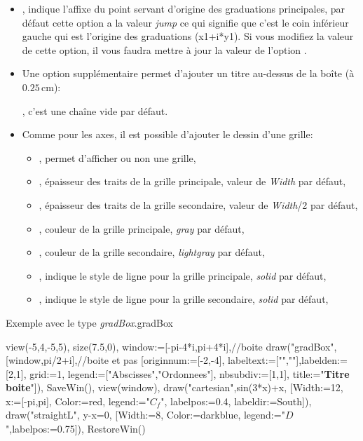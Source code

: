 \begin{itemize}
\begin{itemize}
  \item {}
  \item {}
  \end{itemize}
 \item {}, indique l'affixe du point servant d'origine des graduations principales, par défaut cette option a la valeur \emph{jump} ce qui signifie que c'est le coin inférieur gauche qui est l'origine des graduations (x1+i*y1). Si vous modifiez la valeur de cette option, il vous faudra mettre à jour la valeur de l'option .
 \item Une option supplémentaire permet d'ajouter un titre au-dessus de la boîte (à $0.25$\,cm):\par
{\centering {}, c'est une chaîne vide par défaut.\par}
 \item Comme pour les axes, il est possible d'ajouter le dessin d'une grille:
  \begin{itemize}
  \item {}, permet d'afficher ou non une grille,
  \item {}, épaisseur des traits de la grille principale, valeur de \emph{Width} par défaut,
  \item {}, épaisseur des traits de la grille secondaire, valeur de \emph{Width}/2 par défaut,
  \item {}, couleur de la grille principale, \emph{gray} par défaut,
  \item {}, couleur de la grille secondaire, \emph{lightgray} par défaut,
  \item {}, indique le style de ligne pour la grille principale, \emph{solid} par défaut,
  \item {}, indique le style de ligne pour la grille secondaire, \emph{solid} par défaut,
  \end{itemize}
\end{itemize}

\begin{demo}{Exemple avec le type \emph{gradBox}.}{gradBox}
\begin{texgraph}[name=gradBox]
view(-5,4,-5,5), size(7.5,0),
window:=[-pi-4*i,pi+4*i],//boite
draw("gradBox",[window,pi/2+i],//boite et pas
 [originnum:=[-2,-4], labeltext:=["\pi",""],labelden:=[2,1],
  grid:=1, legend:=["Abscisses","Ordonnees"],
  nbsubdiv:=[1,1], title:="{\large \textbf{Titre boite}}"]),
SaveWin(), view(window),
draw("cartesian",sin(3*x)+x, [Width:=12, x:=[-pi,pi],
 Color:=red, legend:="$C_f$", labelpos:=0.4,
 labeldir:=South]),
draw("straightL", y-x=0, [Width:=8, Color:=darkblue,
 legend:="$D$",labelpos:=0.75]),
RestoreWin() 
\end{texgraph}
\end{demo}

